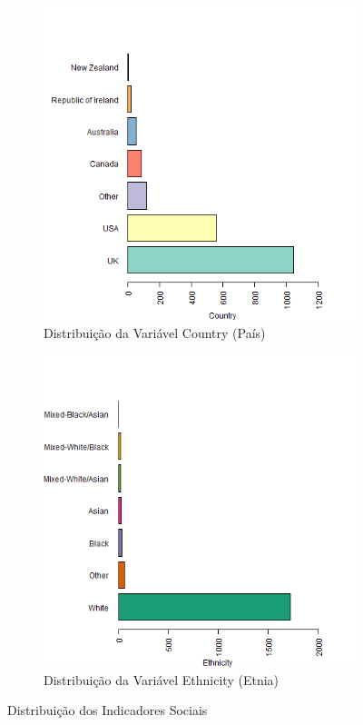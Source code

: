 \documentclass[
	article,			%
	11pt,				%
	oneside,			%
	a4paper,			%
	english,			%
	brazil,				%
	sumario=tradicional
	]{abntex2}
\begin{document}
\begin{figure}[H]
\centering
\begin{subfigure}{.5\textwidth}
  \centering
  \includegraphics[width=\linewidth]{figuras/dist_pais.png}
  \caption{Distribuição da Variável Country (País)}
  \label{soc_pais}
\end{subfigure}%
\begin{subfigure}{.5\textwidth}
  \centering
  \includegraphics[width=\linewidth]{figuras/dist_etnia.png}
  \caption{Distribuição da Variável Ethnicity (Etnia)}
  \label{soc_etnia}
\end{subfigure}
\caption{Distribuição dos Indicadores Sociais}
\label{soc2}
\end{figure}
\end{document}
